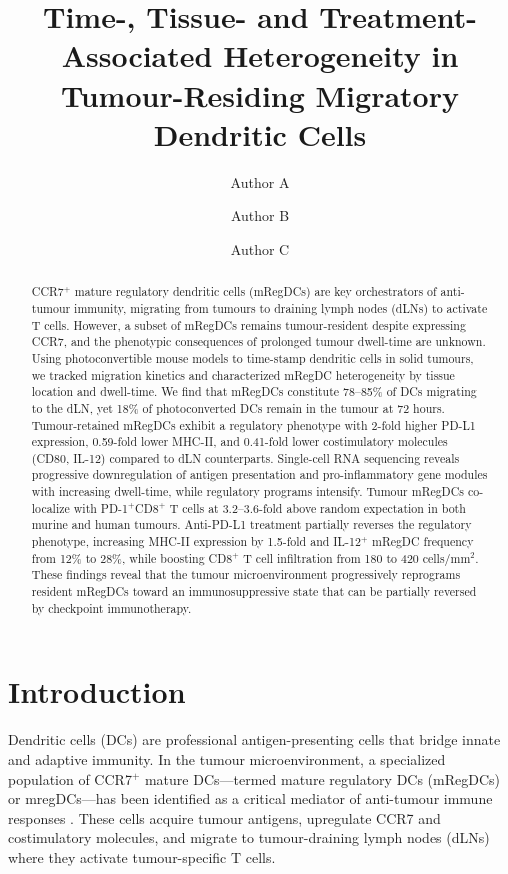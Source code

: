 \documentclass[11pt]{article}
\title{Time-, Tissue- and Treatment-Associated Heterogeneity in Tumour-Residing Migratory Dendritic Cells}
\author[1]{Author A}
\author[1]{Author B}
\author[1,2]{Author C}
\affil[1]{Department of Immunology, Weizmann Institute of Science, Rehovot, Israel}
\affil[2]{Department of Oncology, Tel Aviv Sourasky Medical Center, Tel Aviv, Israel}
\date{}
\begin{document}
\maketitle

\begin{abstract}
CCR7$^+$ mature regulatory dendritic cells (mRegDCs) are key orchestrators of anti-tumour immunity, migrating from tumours to draining lymph nodes (dLNs) to activate T cells. However, a subset of mRegDCs remains tumour-resident despite expressing CCR7, and the phenotypic consequences of prolonged tumour dwell-time are unknown. Using photoconvertible mouse models to time-stamp dendritic cells in solid tumours, we tracked migration kinetics and characterized mRegDC heterogeneity by tissue location and dwell-time. We find that mRegDCs constitute 78--85\% of DCs migrating to the dLN, yet 18\% of photoconverted DCs remain in the tumour at 72 hours. Tumour-retained mRegDCs exhibit a regulatory phenotype with 2-fold higher PD-L1 expression, 0.59-fold lower MHC-II, and 0.41-fold lower costimulatory molecules (CD80, IL-12) compared to dLN counterparts. Single-cell RNA sequencing reveals progressive downregulation of antigen presentation and pro-inflammatory gene modules with increasing dwell-time, while regulatory programs intensify. Tumour mRegDCs co-localize with PD-1$^+$CD8$^+$ T cells at 3.2--3.6-fold above random expectation in both murine and human tumours. Anti-PD-L1 treatment partially reverses the regulatory phenotype, increasing MHC-II expression by 1.5-fold and IL-12$^+$ mRegDC frequency from 12\% to 28\%, while boosting CD8$^+$ T cell infiltration from 180 to 420 cells/mm$^2$. These findings reveal that the tumour microenvironment progressively reprograms resident mRegDCs toward an immunosuppressive state that can be partially reversed by checkpoint immunotherapy.
\end{abstract}

\section{Introduction}

Dendritic cells (DCs) are professional antigen-presenting cells that bridge innate and adaptive immunity. In the tumour microenvironment, a specialized population of CCR7$^+$ mature DCs---termed mature regulatory DCs (mRegDCs) or mregDCs---has been identified as a critical mediator of anti-tumour immune responses \citep{maier2020ctimp, gerhard2021tumor}. These cells acquire tumour antigens, upregulate CCR7 and costimulatory molecules, and migrate to tumour-draining lymph nodes (dLNs) where they activate tumour-specific T cells.
\end{document}
